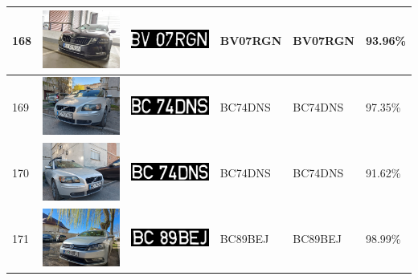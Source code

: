 \documentclass[a4paper,12pt]{report}
\begin{document}
\begin{longtable}{| m{0.6cm} | m{3cm} | m{3cm} | m{1.8cm} | m{1.8cm} | m{1.8cm} |}
    168 & \includegraphics[width=3cm,keepaspectratio]{dataset/105_d1.jpg} & \includegraphics[width=3cm,keepaspectratio]{segmentari/168.jpg} & BV07RGN             & BV07RGN              & 93.96\%    \\ \hline
    169 & \includegraphics[width=3cm,keepaspectratio]{dataset/106_d1.jpg} & \includegraphics[width=3cm,keepaspectratio]{segmentari/169.jpg} & BC74DNS             & BC74DNS              & 97.35\%    \\ \hline
    170 & \includegraphics[width=3cm,keepaspectratio]{dataset/106_s1.jpg} & \includegraphics[width=3cm,keepaspectratio]{segmentari/170.jpg} & BC74DNS             & BC74DNS              & 91.62\%    \\ \hline
    171 & \includegraphics[width=3cm,keepaspectratio]{dataset/107_d1.jpg} & \includegraphics[width=3cm,keepaspectratio]{segmentari/171.jpg} & BC89BEJ             & BC89BEJ              & 98.99\%    \\ \hline

\end{longtable}
\end{document}
